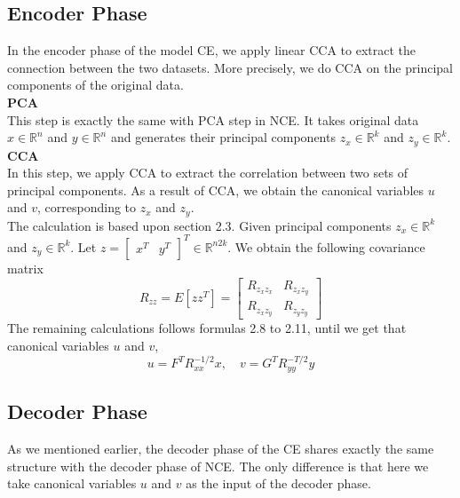 \documentclass[12pt]{report} %
\begin{document}
\subsection{Encoder Phase}
In the encoder phase of the model CE, we apply linear CCA to extract the connection between the two datasets. More precisely, we do CCA on the principal components of the original data.\\ 

\textbf{PCA}\\
This step is exactly the same with PCA step in NCE. It takes original data $x\in \mathbb{R}^{n}$ and $y\in \mathbb{R}^{n}$ and generates their principal components $z_x\in \mathbb{R}^{k}$ and $z_y\in \mathbb{R}^{k}$.\\

\textbf{CCA}\\
In this step, we apply CCA to extract the correlation between two sets of principal components. As a result of CCA, we obtain the canonical variables $u$ and $v$, corresponding to $z_x$ and $z_y$. \\
The calculation is based upon section 2.3. Given principal components $z_x\in \mathbb{R}^{k}$ and $z_y\in \mathbb{R}^{k}$. Let $z= \begin{bmatrix}x^T & y^T\end{bmatrix}^T \in \mathbb{R}^{n2k}$. We obtain the following covariance matrix
\begin{equation}
R_{zz}=E[zz^T]=\begin{bmatrix}
R_{z_{x}z_{x}} & R_{z_{x}z_{y}} \\
R_{z_{x}z_{y}} & R_{z_{y}z_{y}}
\end{bmatrix}
\end{equation}
The remaining calculations follows formulas 2.8 to 2.11, until we get that canonical variables $u$ and $v$,
\begin{equation}
u=F^TR_{xx}^{-1/2}x,\quad v=G^TR_{yy}^{-T/2}y
\end{equation}

\subsection{Decoder Phase}
As we mentioned earlier, the decoder phase of the CE shares exactly the same structure with the decoder phase of NCE. The only difference is that here we take canonical variables $u$ and $v$ as the input of the decoder phase. 
\end{document}
